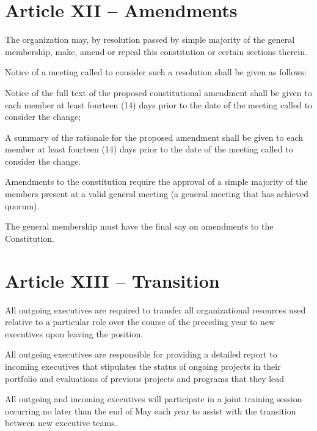 \documentclass[12pt,a4paper]{article}
\begin{document}
\section{Article XII – Amendments}

\begin{constitutionlist}
\item The organization may, by resolution passed by simple majority of the general membership, make, amend or repeal this constitution or certain sections therein.

\item Notice of a meeting called to consider such a resolution shall be given as follows:

\begin{constitutionlist}
\item Notice of the full text of the proposed constitutional amendment shall be given to each member at least fourteen (14) days prior to the date of the meeting called to consider the change;

\item A summary of the rationale for the proposed amendment shall be given to each member at least fourteen (14) days prior to the date of the meeting called to consider the change.
\end{constitutionlist}

\item Amendments to the constitution require the approval of a simple majority of the members present at a valid general meeting (a general meeting that has achieved quorum).

\item The general membership must have the final say on amendments to the Constitution.
\end{constitutionlist}

\section{Article XIII – Transition}

\begin{constitutionlist}
\item All outgoing executives are required to transfer all organizational resources used relative to a particular role over the course of the preceding year to new executives upon leaving the position.

\item All outgoing executives are responsible for providing a detailed report to incoming executives that stipulates the status of ongoing projects in their portfolio and evaluations of previous projects and programs that they lead

\item All outgoing and incoming executives will participate in a joint training session occurring no later than the end of May each year to assist with the transition between new executive teams.
\end{constitutionlist}
\end{document}
